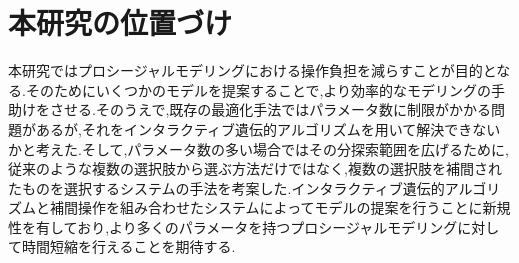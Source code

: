 \section{本研究の位置づけ}
本研究ではプロシージャルモデリングにおける操作負担を減らすことが目的となる.そのためにいくつかのモデルを提案することで,より効率的なモデリングの手助けをさせる.そのうえで,既存の最適化手法ではパラメータ数に制限がかかる問題があるが,それをインタラクティブ遺伝的アルゴリズムを用いて解決できないかと考えた.そして,パラメータ数の多い場合ではその分探索範囲を広げるために,従来のような複数の選択肢から選ぶ方法だけではなく,複数の選択肢を補間されたものを選択するシステムの手法を考案した.インタラクティブ遺伝的アルゴリズムと補間操作を組み合わせたシステムによってモデルの提案を行うことに新規性を有しており,より多くのパラメータを持つプロシージャルモデリングに対して時間短縮を行えることを期待する.